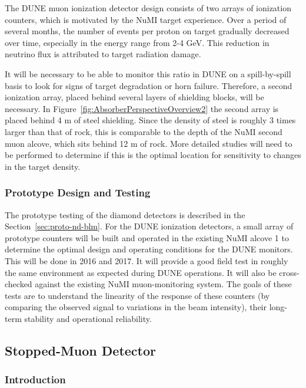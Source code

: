 The DUNE muon ionization detector design consists of two arrays of 
ionization counters, which is motivated by the NuMI target experience.  
Over a period of several months, the number of events per proton on target 
gradually decreased over time, especially in the energy range from 2-4 GeV.  
This reduction in neutrino flux is attributed to target radiation damage.

It will be necessary to be able to monitor this ratio in DUNE on a spill-by-spill 
basis to look for signs of target degradation or horn failure.  
Therefore, a second ionization array, placed behind several layers of 
shielding blocks, will be necessary.  In Figure~\ref{fig:AbsorberPerspectiveOverview2}
the second array is placed behind 4 m of steel shielding.  
Since the density of steel is roughly 3 times larger than that of rock, 
this is comparable to the depth of the NuMI second muon alcove, which sits behind 12 m of rock.  
More detailed studies will need to be performed to determine 
if this is the optimal location for sensitivity to changes in the target density.


\subsubsection{Prototype Design and Testing}

The prototype testing of the diamond detectors is described in the 
Section~\ref{sec:proto-nd-blm}. For the DUNE ionization detectors, a small array of prototype
counters will be built and operated in the existing NuMI
alcove 1 to determine the optimal design and operating conditions for
the DUNE monitors. This will be done in 2016 and 2017. 
It will provide a good field test in roughly the same environment as expected during DUNE
operations. It will also be cross-checked against the existing NuMI
muon-monitoring system.  The goals of these tests are to understand the linearity 
of the response of these counters (by comparing the observed signal to variations in the beam intensity), their long-term stability and operational reliability.  


%
%
\subsection{Stopped-Muon Detector} %
\label{subsec:detectors-nd-blm-stopped-mu}

\subsubsection{Introduction}

